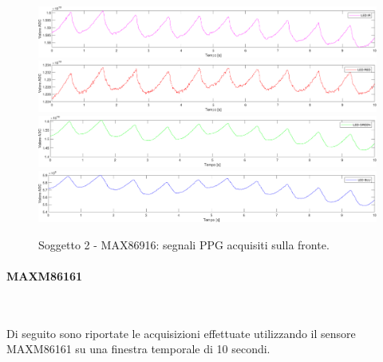 \begin{figure}[h]
	\centering
	\includegraphics[width=1\linewidth]{ImageFiles/Misure Preliminari/Soggetto 2/max86916/fronte_ired}
	\includegraphics[width=1\linewidth]{ImageFiles/Misure Preliminari/Soggetto 2/max86916/fronte_red}
	\includegraphics[width=1\linewidth]{ImageFiles/Misure Preliminari/Soggetto 2/max86916/fronte_green}
	\includegraphics[width=1\linewidth]{ImageFiles/Misure Preliminari/Soggetto 2/max86916/fronte_blu}
	\caption{Soggetto 2 - MAX86916: segnali PPG acquisiti sulla fronte.}
	\label{fig:soggetto2_MAX86916_fronte}
\end{figure}

\clearpage

\paragraph{MAXM86161}~

Di seguito sono riportate le acquisizioni effettuate utilizzando il sensore MAXM86161 su una finestra temporale di 10 secondi.

